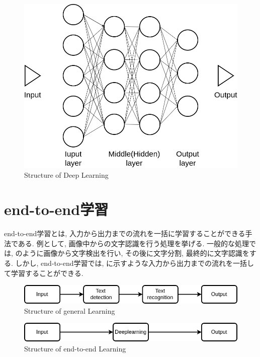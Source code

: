 \begin{figure}[h]
     \centering
     \includegraphics[keepaspectratio, scale=0.3]
     {images/dl.png}
     \caption{Structure of Deep Learning}
     \label{Fig:dl}
     \end{figure}

\newpage
\section{end-to-end学習}
end-to-end学習とは, 入力から出力までの流れを一括に学習することができる手法である. 例として, 画像中からの文字認識を行う処理を挙げる. 一般的な処理では, のように画像から文字検出を行い, その後に文字分割, 最終的に文字認識をする. しかし, end-to-end学習では, に示すような入力から出力までの流れを一括して学習することができる. 

\vspace{35mm}

\begin{figure}[h]
     \centering
     \includegraphics[keepaspectratio, scale=0.5]
     {images/example.png}
     \caption{Structure of general Learning}
     \label{Fig:example}
     \end{figure}

\begin{figure}[h]
     \centering
     \includegraphics[keepaspectratio, scale=0.5]
     {images/end-to-end.png}
     \caption{Structure of end-to-end Learning}
     \label{Fig:end-to-end}
     \end{figure}

